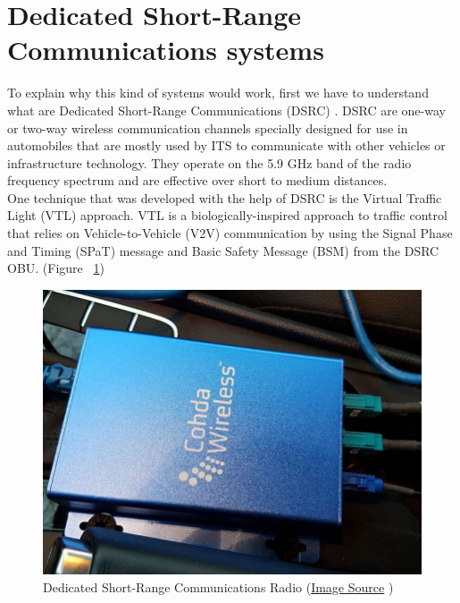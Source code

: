 \documentclass[17pt]{report}
\begin{document}
\section{Dedicated Short-Range Communications systems}
\indent \indent
To explain why this kind of systems would work, first we have to understand what
are Dedicated Short-Range Communications (DSRC) \cite{Zhang2018}
\cite{Tomar2022}. DSRC are one-way or two-way wireless communication channels
specially designed for use in automobiles that are mostly used by ITS to
communicate with other vehicles or infrastructure technology. They operate on
the 5.9 GHz band of the radio frequency spectrum and are effective over short
to medium distances.\\
\indent \indent
One technique that was developed with the help of DSRC is the Virtual Traffic
Light (VTL) approach. VTL is a biologically-inspired approach to traffic
control that relies on Vehicle-to-Vehicle (V2V) communication by using the
Signal Phase and Timing (SPaT) message and Basic Safety Message (BSM) from
the DSRC OBU. (Figure ~\ref{fig:DSRCRadio})
\begin{figure}[h!]
    \includegraphics[width=\textwidth]{DSRCRadio.png}
    \caption{Dedicated Short-Range Communications Radio 
    (\href{https://www.researchgate.net/figure/DSRC-radios-used-in-the-prototype-system_fig1_326198424}{Image Source} \textcopyright)}
    \label{fig:DSRCRadio}
\end{figure}\\
\end{document}
